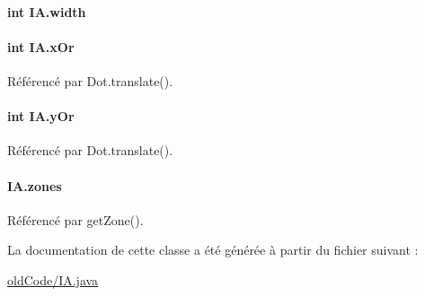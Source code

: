 \paragraph[{width}]{\setlength{\rightskip}{0pt plus 5cm}int I\+A.\+width\hspace{0.3cm}{\ttfamily [private]}}\label{classIA_ab31d73d4297034d5a8fddc6ae1cd5c46}
\hypertarget{classIA_a7b2224d63b5c3c6f66456fa76d35ca17}{}
\paragraph[{x\+Or}]{\setlength{\rightskip}{0pt plus 5cm}int I\+A.\+x\+Or\hspace{0.3cm}{\ttfamily [static]}}\label{classIA_a7b2224d63b5c3c6f66456fa76d35ca17}


Référencé par Dot.\+translate().

\hypertarget{classIA_a715cc2f5ecfdcc10070efedae3ee1c1e}{}
\paragraph[{y\+Or}]{\setlength{\rightskip}{0pt plus 5cm}int I\+A.\+y\+Or\hspace{0.3cm}{\ttfamily [static]}}\label{classIA_a715cc2f5ecfdcc10070efedae3ee1c1e}


Référencé par Dot.\+translate().

\hypertarget{classIA_aaa96f9a826c59be2e231d020b05312d8}{}
\paragraph[{zones}]{ I\+A.\+zones\hspace{0.3cm}{\ttfamily [private]}}\label{classIA_aaa96f9a826c59be2e231d020b05312d8}


Référencé par get\+Zone().



La documentation de cette classe a été générée à partir du fichier suivant \+:\begin{DoxyCompactItemize}
\item 
\hyperlink{oldCode_2IA_8java}{old\+Code/\+I\+A.\+java}\end{DoxyCompactItemize}
